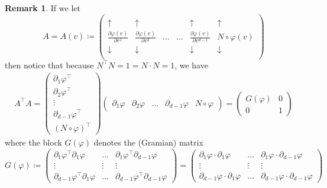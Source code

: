 \documentclass{article}
\theoremstyle{definition}
\newcommand{\p}{\partial}
\newcommand{\f}[2]{\frac{#1}{#2}}
\theoremstyle{theorem}
\newtheorem{remark}{Remark}
\begin{document}
\begin{remark}\label{rem:ATA}
If we let 
\begin{equation*}
    A = A(v) \coloneqq \left(\begin{array}{ccccc|c}
     & & & & &\\
    \uparrow &\uparrow & & & \uparrow &\uparrow \\ 
    \f{\p \varphi(v)}{\p v^1}& \f{\p \varphi(v)}{\p v^2} & \dots &\dots&\f{\p \varphi(v)}{\p v^{d-1}}& N\circ \varphi(v) \\
    \downarrow  &\downarrow  & & & \downarrow  &\downarrow \\ 
    &&&& & 
    \end{array}\right)
\end{equation*}
then notice that because $N^\top N  = 1 = N\cdot N = 1$, we have 
\begin{eqnarray*}
    A^\top A = \begin{pmatrix}
    \p_1 \varphi^\top \\
    \p_2 \varphi^\top \\
    \vdots \\
    \p_{d-1} \varphi^\top \\
    (N\circ \varphi)^\top
    \end{pmatrix}\begin{pmatrix}
    \p_1 \varphi &
    \p_2 \varphi &
    \dots &
    \p_{d-1} \varphi&
    N\circ \varphi
    \end{pmatrix}
    =\begin{pmatrix}
    G(\varphi) & 0 \\ 0 & 1
    \end{pmatrix}
\end{eqnarray*}
where the block $G(\varphi)$ denotes the (Gramian) matrix
\begin{equation*}
    G(\varphi) \coloneqq \begin{pmatrix} 
    \p_1 \varphi^\top \p_1 \varphi & \dots & \p_1 \varphi^\top \p_{d-1}\varphi \\
    \vdots & \vdots & \vdots \\
    \p_{d-1} \varphi^\top \p_1 \varphi & \dots & \p_{d-1} \varphi^\top \p_{d-1}\varphi 
    \end{pmatrix}
    = 
    \begin{pmatrix} 
    \p_1 \varphi \cdot \p_1 \varphi & \dots & \p_1 \varphi\cdot \p_{d-1}\varphi \\
    \vdots & \vdots & \vdots \\
    \p_{d-1} \varphi \cdot\p_1 \varphi & \dots & \p_{d-1} \varphi \cdot \p_{d-1}\varphi 

\end{pmatrix}
\end{equation*}
\end{remark}
\end{document}
